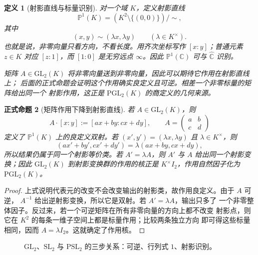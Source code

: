 \documentclass[UTF8,fontset=none,a4paper,11pt]{ctexart}
\theoremstyle{foundation-definition}
\newtheorem{definition}{定义}[section]
\theoremstyle{foundation-theorem}
\theoremstyle{foundation-proposition}
\newtheorem{proposition}[definition]{正式命题}
\theoremstyle{foundation-example}
\theoremstyle{foundation-remark}
\theoremstyle{foundation-theorem}
\begin{document}
\begin{definition}[射影直线与标量识别]\label{def:projective-line}
对一个域 \(K\)，定义射影直线
\[
\mathbb P^1(K)
=(K^2\setminus\{(0,0)\})/{\sim},
\]
其中
\[
(x,y)\sim(\lambda x,\lambda y)\qquad(\lambda\in K^\times).
\]
也就是说，非零向量只看方向，不看长度。用齐次坐标写作
\([x:y]\)；普通元素 \(z\in K\) 对应 \([z:1]\)，而 \([1:0]\) 是无穷远点
\(\infty\)。因此 \(\mathbb P^1(\mathbb C)\) 可与 \(\widehat{\mathbb C}\) 识别。

矩阵 \(A\in\mathrm{GL}_2(K)\) 将非零向量送到非零向量，因此可以期待它作用在射影直线上；
后面的正式命题会证明这个作用确实良定义且可逆。相差一个非零标量的矩阵给出同一个
射影作用，这正是 \(\mathrm{PGL}_2(K)\) 的商定义的几何来源。
\end{definition}

\begin{proposition}[矩阵作用下降到射影直线]\label{prop:projective-action}
若 \(A\in\mathrm{GL}_2(K)\)，则
\[
A\cdot[x:y]:=[ax+by:cx+dy],
\qquad
A=\begin{pmatrix}a&b\\c&d\end{pmatrix}
\]
定义了 \(\mathbb P^1(K)\) 上的良定义双射。若
\((x',y')=(\lambda x,\lambda y)\) 且 \(\lambda\in K^\times\)，则
\[
(ax'+by',cx'+dy')=\lambda(ax+by,cx+dy),
\]
所以结果仍属于同一个射影等价类。若 \(A'=\lambda A\)，则 \(A'\) 与 \(A\)
给出同一个射影变换；因此 \(\mathrm{GL}_2(K)\) 到射影变换群的作用的核正是
\(K^\times I_2\)，作用自然因子化为 \(\mathrm{PGL}_2(K)\)。
\end{proposition}

\begin{proof}
上式说明代表元的改变不会改变输出的射影类，故作用良定义。由于 \(A\) 可逆，
\(A^{-1}\) 给出逆射影变换，所以它是双射。若 \(A'=\lambda A\)，输出只多了
一个非零整体因子。反过来，若一个可逆矩阵在所有非零向量的方向上都不改变
射影点，则它在 \(K^2\) 的每条一维子空间上都是标量作用；比较两条独立方向
即可得这些标量相同，因而 \(A=\lambda I_2\)。这就确定了作用核。
\end{proof}

\begin{figure}[htbp]
\centering
{}
\caption{\(\mathrm{GL}_2\)、\(\mathrm{SL}_2\) 与 \(\mathrm{PSL}_2\) 的三步关系：可逆、行列式 \(1\)、射影识别。}
\label{fig:matrix-group-quotient}
\end{figure}
\end{document}
